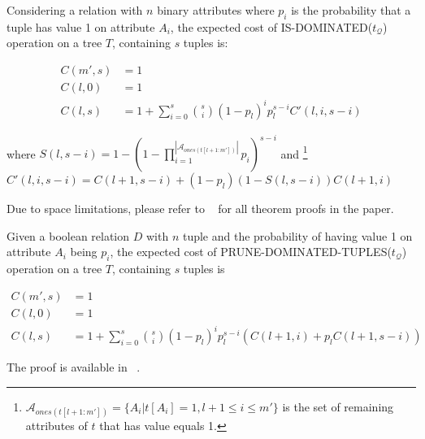 \begin{theorem}\label{thm:expectedCostSTISDominated}
Considering a relation with $n$ binary attributes where $p_i$ is the probability that a tuple has value 1 on attribute $A_i$, the expected cost of IS-DOMINATED($t_\mathcal{Q}$) operation on a tree $T$, containing $s$ tuples is:
\begin{small}
\begin{align}\label{eq:expectedCostSTISDominated}
    \nonumber
    C(m', s) &= 1 \\
    \nonumber
    C(l, 0) &= 1 \\
    C(l, s) &= 1 + \sum_{i=0}^s {s \choose i} (1-p_l)^i p_l^{s-i} C'(l, i, s-i)
\end{align}
\end{small}
\hspace{-1mm}where $S(l, s-i) = 1 - (1 - \prod\nolimits_{i=1}^{|\mathcal{A}_{ones(t[l+1:m'])}|}p_i)^{s-i}$ and \footnote{$\mathcal{A}_{ones(t[l+1:m'])} = \{A_i | t[A_i] = 1, l+1 \leq i \leq m'\}$ is the set of remaining attributes of $t$ that has value equals 1.} $C'(l, i, s-i) = C(l+1, s-i) + (1-p_l)(1-S(l, s-i))C(l+1, i)$
\end{theorem}
Due to space limitations, please refer to ~\cite{TechReport} for all theorem proofs in the paper.

\begin{theorem}\label{thm:expectedCostSTPruneDominatedTuples}
Given a boolean relation $D$ with $n$ tuple and the probability of having value 1 on attribute $A_i$ being $p_i$, the expected cost of PRUNE-DOMINATED-TUPLES($t_\mathcal{Q}$) operation on a tree $T$, containing $s$ tuples is
\begin{small}
\begin{align} \label{eq:expectedCostSTPruneDominatedTuples}
    \nonumber
    C(m', s) &= 1 \\
    \nonumber
    C(l, 0) &= 1 \\
    C(l, s) &= 1 + \sum_{i=0}^s{s \choose i} (1-p_l)^i p_l^{s-i} (C(l+1, i) + p_lC(l+1, s-i))
\end{align}
\end{small}
\end{theorem}
The proof is available in ~\cite{TechReport}.


